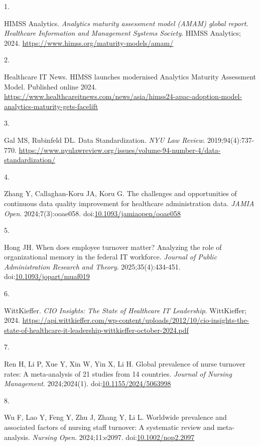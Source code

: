 \documentclass[
  american,
  11pt,
  letterpaper,
  oneside  ,captions=tableheading
]{scrartcl}
\newlength{\cslhangindent}
\newlength{\csllabelwidth}
\newenvironment{CSLReferences}[2] %
 {\begin{list}{}{%
  \setlength{\itemindent}{0pt}
  \setlength{\leftmargin}{0pt}
  \setlength{\parsep}{0pt}
  \ifodd #1
   \setlength{\leftmargin}{\cslhangindent}
   \setlength{\itemindent}{-1\cslhangindent}
  \fi
  \setlength{\itemsep}{#2\baselineskip}}}
 {\end{list}}
\newcommand{\CSLLeftMargin}[1]{\parbox[t]{\csllabelwidth}{\strut#1\strut}}
\newcommand{\CSLRightInline}[1]{\parbox[t]{\linewidth - \csllabelwidth}{\strut#1\strut}}
\begin{document}
\protect{}\label{refs}
\begin{CSLReferences}{0}{1}
\CSLLeftMargin{1. }%
\CSLRightInline{HIMSS Analytics. \emph{{Analytics maturity assessment
model (AMAM) global report. Healthcare Information and Management
Systems Society}}. {HIMSS Analytics}; 2024.
\url{https://www.himss.org/maturity-models/amam/}}

\CSLLeftMargin{2. }%
\CSLRightInline{Healthcare IT News. {HIMSS launches modernised Analytics
Maturity Assessment Model}. Published online 2024.
\url{https://www.healthcareitnews.com/news/asia/himss24-apac-adoption-model-analytics-maturity-gets-facelift}}

\CSLLeftMargin{3. }%
\CSLRightInline{Gal MS, Rubinfeld DL. {Data Standardization}. \emph{NYU
Law Review}. 2019;94(4):737-770.
\url{https://www.nyulawreview.org/issues/volume-94-number-4/data-standardization/}}

\CSLLeftMargin{4. }%
\CSLRightInline{Zhang Y, Callaghan-Koru JA, Koru G. {The challenges and
opportunities of continuous data quality improvement for healthcare
administration data}. \emph{JAMIA Open}. 2024;7(3):ooae058.
doi:\href{https://doi.org/10.1093/jamiaopen/ooae058}{10.1093/jamiaopen/ooae058}}

\CSLLeftMargin{5. }%
\CSLRightInline{Hong JH. When does employee turnover matter? Analyzing
the role of organizational memory in the federal IT workforce.
\emph{Journal of Public Administration Research and Theory}.
2025;35(4):434-451.
doi:\href{https://doi.org/10.1093/jopart/muaf019}{10.1093/jopart/muaf019}}

\CSLLeftMargin{6. }%
\CSLRightInline{WittKieffer. \emph{{CIO Insights: The State of
Healthcare IT Leadership}}. WittKieffer; 2024.
\url{https://api.wittkieffer.com/wp-content/uploads/2012/10/cio-insights-the-state-of-healthcare-it-leadership-wittkieffer-october-2024.pdf}}

\CSLLeftMargin{7. }%
\CSLRightInline{Ren H, Li P, Xue Y, Xin W, Yin X, Li H. {Global
prevalence of nurse turnover rates: A meta-analysis of 21 studies from
14 countries}. \emph{Journal of Nursing Management}. 2024;2024(1).
doi:\href{https://doi.org/10.1155/2024/5063998}{10.1155/2024/5063998}}

\CSLLeftMargin{8. }%
\CSLRightInline{Wu F, Lao Y, Feng Y, Zhu J, Zhang Y, Li L. {Worldwide
prevalence and associated factors of nursing staff turnover: A
systematic review and meta-analysis}. \emph{Nursing Open}.
2024;11:e2097.
doi:\href{https://doi.org/10.1002/nop2.2097}{10.1002/nop2.2097}}


\end{CSLReferences}
\end{document}
